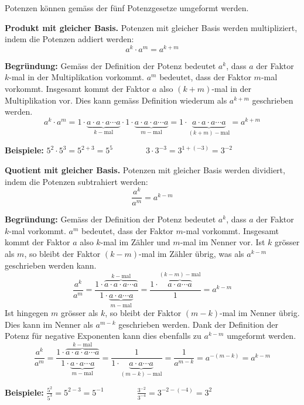 Potenzen können gemäss der fünf Potenzgesetze umgeformt werden.
\begin{theorem}
  \textbf{Produkt mit gleicher Basis.} Potenzen mit gleicher Basis werden multipliziert, indem die Potenzen addiert werden:
  \[
    a^{k} \cdot a^{m} = a^{k+m}
  \]
\end{theorem}
\textbf{Begründung:} Gemäss der Definition der Potenz bedeutet $a^{k}$, dass $a$ der Faktor $k$-mal in der Multiplikation vorkommt. $a^{m}$ bedeutet, dass der Faktor $m$-mal vorkommt. Insgesamt kommt der Faktor $a$ also $(k+m)$-mal in der Multiplikation vor. Dies kann gemäss Definition wiederum als $a^{k+m}$ geschrieben werden.
\[
  a^{k}\cdot a^{m} = 1\cdot\underbrace{a\cdot a\cdot a\cdots a}_{k-\text{mal}}\cdot 1\cdot\underbrace{a\cdot a\cdot a\cdots a}_{m-\text{mal}} = 1\cdot\underbrace{a\cdot a\cdot a\cdots a}_{(k+m)-\text{mal}} = a^{k+m}
\]
\begin{example}
  \textbf{Beispiele:} $\displaystyle 5^{2}\cdot 5^{3} = 5^{2+3} = 5^{5} \qquad\qquad 3\cdot 3^{-3} = 3^{1+(-3)} = 3^{-2}$
\end{example}
\vspace{1cm}
\begin{theorem}
  \textbf{Quotient mit gleicher Basis.} Potenzen mit gleicher Basis werden dividiert, indem die Potenzen subtrahiert werden:
  \[
    \frac{a^{k}}{a^{m}} = a^{k-m}
  \]
\end{theorem}
\textbf{Begründung:} Gemäss der Definition der Potenz bedeutet $a^{k}$, dass $a$ der Faktor $k$-mal vorkommt. $a^{m}$ bedeutet, dass der Faktor $m$-mal vorkommt. Insgesamt kommt der Faktor $a$ also $k$-mal im Zähler und $m$-mal im Nenner vor. Ist $k$ grösser als $m$, so bleibt der Faktor $(k-m)$-mal im Zähler übrig, was als $a^{k-m}$ geschrieben werden kann.
\[
  \frac{a^{k}}{a^{m}} = \frac{1\cdot\overbrace{a\cdot a\cdot a\cdots a}^{k-\text{mal}}}{1\cdot\underbrace{a\cdot a\cdots a}_{m-\text{mal}}} = \frac{1\cdot\overbrace{a\cdot a\cdots a}^{(k-m)-\text{mal}}}{1} = a^{k-m}
\]
Ist hingegen $m$ grösser als $k$, so bleibt der Faktor $(m-k)$-mal im Nenner übrig. Dies kann im Nenner als $a^{m-k}$ geschrieben werden. Dank der Definition der Potenz für negative Exponenten kann dies ebenfalls zu $a^{k-m}$ umgeformt werden.
\[
  \frac{a^{k}}{a^{m}} = \frac{1\cdot\overbrace{a\cdot a\cdot a\cdots a}^{k-\text{mal}}}{1\cdot\underbrace{a\cdot a\cdots a}_{m-\text{mal}}} = \frac{1}{1\cdot\underbrace{a\cdot a\cdots a}_{(m-k)-\text{mal}}} = \frac{1}{a^{m-k}} = a^{-(m-k)} = a^{k-m}
\]
\begin{example}
  \textbf{Beispiele:} $\displaystyle \frac{5^{2}}{5^{3}} = 5^{2-3} = 5^{-1} \qquad\qquad \frac{3^{-2}}{3^{-4}} = 3^{-2-(-4)} = 3^{2}$
\end{example}
